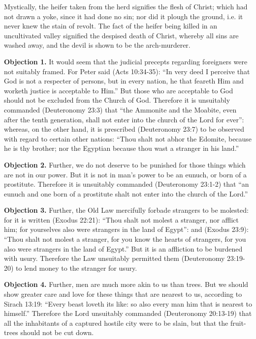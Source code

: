 Mystically, the heifer taken from the herd signifies the flesh of Christ; which had not drawn a yoke, since it had done no sin; nor did it plough the ground, i.e. it never knew the stain of revolt. The fact of the heifer being killed in an uncultivated valley signified the despised death of Christ, whereby all sins are washed away, and the devil is shown to be the arch-murderer.


\textbf{Objection 1.} It would seem that the judicial precepts regarding foreigners were not suitably framed. For Peter said (Acts 10:34-35): ``In very deed I perceive that God is not a respecter of persons, but in every nation, he that feareth Him and worketh justice is acceptable to Him.'' But those who are acceptable to God should not be excluded from the Church of God. Therefore it is unsuitably commanded (Deuteronomy 23:3) that ``the Ammonite and the Moabite, even after the tenth generation, shall not enter into the church of the Lord for ever'': whereas, on the other hand, it is prescribed (Deuteronomy 23:7) to be observed with regard to certain other nations: ``Thou shalt not abhor the Edomite, because he is thy brother; nor the Egyptian because thou wast a stranger in his land.''

\textbf{Objection 2.} Further, we do not deserve to be punished for those things which are not in our power. But it is not in man's power to be an eunuch, or born of a prostitute. Therefore it is unsuitably commanded (Deuteronomy 23:1-2) that ``an eunuch and one born of a prostitute shalt not enter into the church of the Lord.''

\textbf{Objection 3.} Further, the Old Law mercifully forbade strangers to be molested: for it is written (Exodus 22:21): ``Thou shalt not molest a stranger, nor afflict him; for yourselves also were strangers in the land of Egypt'': and (Exodus 23:9): ``Thou shalt not molest a stranger, for you know the hearts of strangers, for you also were strangers in the land of Egypt.'' But it is an affliction to be burdened with usury. Therefore the Law unsuitably permitted them (Deuteronomy 23:19-20) to lend money to the stranger for usury.

\textbf{Objection 4.} Further, men are much more akin to us than trees. But we should show greater care and love for these things that are nearest to us, according to Sirach 13:19: ``Every beast loveth its like: so also every man him that is nearest to himself.'' Therefore the Lord unsuitably commanded (Deuteronomy 20:13-19) that all the inhabitants of a captured hostile city were to be slain, but that the fruit-trees should not be cut down.


